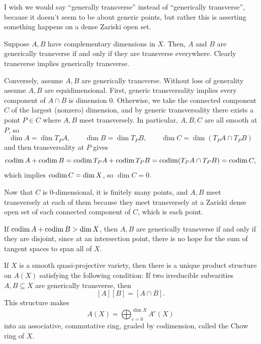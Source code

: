 \documentclass[12pt]{article}
\begin{document}
{\color{red} I wish we would say ``generally transverse'' instead of ``generically transverse'', because it doesn't seem to be about generic points, but rather this is asserting something happens on a dense Zariski open set.}

\begin{eg}
    Suppose $A,B$ have complementary dimensions in $X$. Then, $A$ and $B$ are generically transverse if and only if they are transverse everywhere. Clearly transverse implies generically transverse.
    
    Conversely, assume $A,B$ are generically transverse. Without loss of generality assume $A,B$ are equidimensional. First, generic transversality implies every component of $A\cap B$ is dimension 0. Otherwise, we take the connected component $C$ of the largest (nonzero) dimension, and by generic transversality there exists a point $P\in C$ where $A,B$ meet transversely. In particular, $A,B,C$ are all smooth at $P$, so
    \[\dim A = \dim T_P A, \qquad \dim B = \dim T_P B, \qquad \dim C = \dim (T_P A\cap T_P B)\]
    and then transversality at $P$ gives
    \[\operatorname{codim} A + \operatorname{codim} B = \operatorname{codim} T_P A + \operatorname{codim} T_P B = \operatorname{codim}(T_P A \cap T_P B) = \operatorname{codim} C,\]
    which implies $\operatorname{codim} C = \dim X$, so $\dim C = 0$.

    Now that $C$ is $0$-dimensional, it is finitely many points, and $A,B$ meet transversely at each of them because they meet transversely at a Zariski dense open set of each connected component of $C$, which is each point.
\end{eg}

\begin{eg}
    If $\operatorname{codim} A + \operatorname{codim} B > \dim X$, then $A,B$ are generically transverse if and only if they are disjoint, since at an intersection point, there is no hope for the sum of tangent spaces to span all of $X$.
\end{eg}

\begin{thmdef}
    If $X$ is a smooth quasi-projective variety, then there is a unique product structure on $A(X)$ satisfying the following condition: If two irreducible subvarities $A,B\subseteq X$ are generically transverse, then
    \[[A][B]=[A\cap B].\]
    This structure makes
    \[A(X) = \bigoplus_{c=0}^{\dim X} A^c(X)\]
    into an associative, commutative ring, graded by codimension, called the Chow ring of $X$.
\end{thmdef}

\begin{lem}
    
\end{lem}
\end{document}
